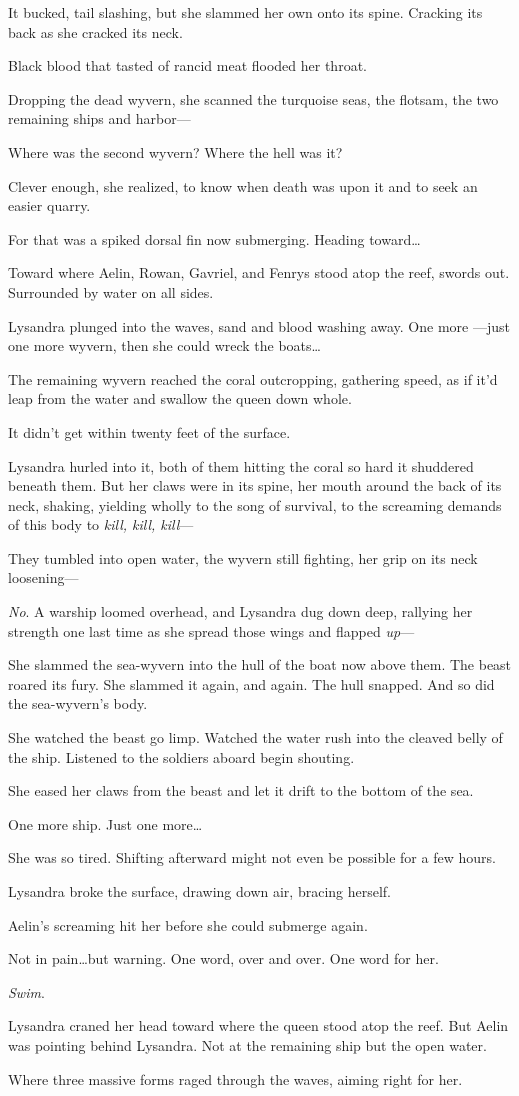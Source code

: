 It bucked, tail slashing, but she slammed her own onto its spine.
Cracking its back as she cracked its neck.

Black blood that tasted of rancid meat flooded her throat.

Dropping the dead wyvern, she scanned the turquoise seas, the flotsam, the two remaining ships and harbor---

Where was the second wyvern?
Where the hell was it?

Clever enough, she realized, to know when death was upon it and to seek an easier quarry.

For that was a spiked dorsal fin now submerging.
Heading toward\ldots{}

Toward where Aelin, Rowan, Gavriel, and Fenrys stood atop the reef, swords out.
Surrounded by water on all sides.

Lysandra plunged into the waves, sand and blood washing away.
One more ---just one more wyvern, then she could wreck the boats\ldots{}

The remaining wyvern reached the coral outcropping, gathering speed, as if it'd leap from the water and swallow the queen down whole.

It didn't get within twenty feet of the surface.

Lysandra hurled into it, both of them hitting the coral so hard it shuddered beneath them.
But her claws were in its spine, her mouth around the back of its neck, shaking, yielding wholly to the song of survival, to the screaming demands of this body to \emph{kill, kill, kill}---

They tumbled into open water, the wyvern still fighting, her grip on its neck loosening---

\emph{No}.
A warship loomed overhead, and Lysandra dug down deep, rallying her strength one last time as she spread those wings and flapped \emph{up}---

She slammed the sea-wyvern into the hull of the boat now above them.
The beast roared its fury.
She slammed it again, and again.
The hull snapped.
And so did the sea-wyvern's body.

She watched the beast go limp.
Watched the water rush into the cleaved belly of the ship.
Listened to the soldiers aboard begin shouting.

She eased her claws from the beast and let it drift to the bottom of the sea.

One more ship.
Just one more\ldots{}

She was so tired.
Shifting afterward might not even be possible for a few hours.

Lysandra broke the surface, drawing down air, bracing herself.

Aelin's screaming hit her before she could submerge again.

Not in pain\ldots but warning.
One word, over and over.
One word for her.

\emph{Swim}.

Lysandra craned her head toward where the queen stood atop the reef.
But Aelin was pointing behind Lysandra.
Not at the remaining ship 
but the open water.

Where three massive forms raged through the waves, aiming right for her.
